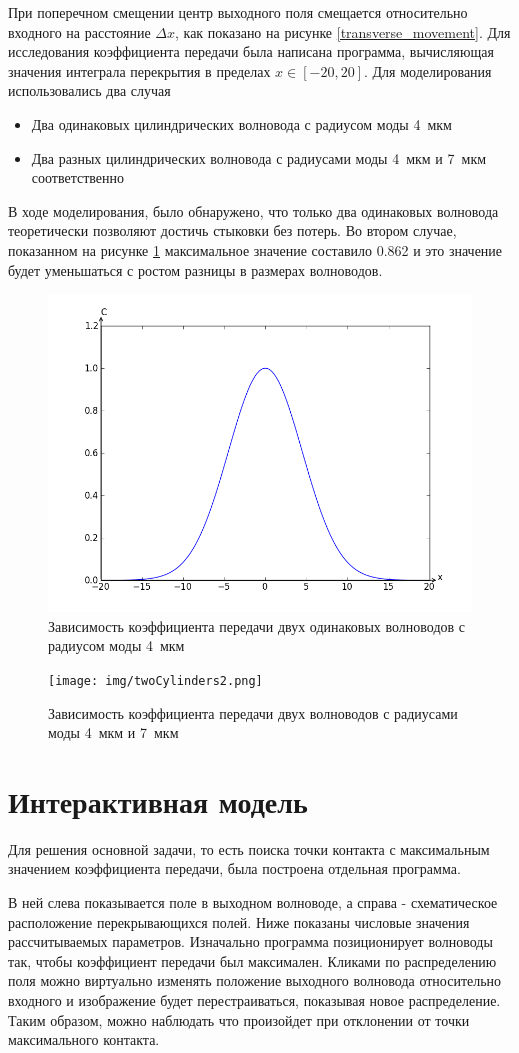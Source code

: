 При поперечном смещении центр выходного поля смещается относительно входного на расстояние $\Delta x$, как показано на рисунке \ref{transverse_movement}. Для исследования коэффициента передачи была написана программа, вычисляющая значения интеграла перекрытия в пределах $x \in [-20, 20]$.
Для моделирования использовались два случая
\begin{itemize}
	\item Два одинаковых цилиндрических волновода с радиусом моды 4~мкм
	\item Два разных цилиндрических волновода с радиусами моды 4~мкм и 7~мкм соответственно
\end{itemize}

В ходе моделирования, было обнаружено, что только два одинаковых волновода теоретически позволяют достичь стыковки без потерь. Во втором случае, показанном на рисунке \ref{twoCylinders2} максимальное значение составило 0.862 и это значение будет уменьшаться с ростом разницы в размерах волноводов.

\begin{figure}[h!]
		\includegraphics[width=0.5\linewidth]{img/twoCylinders.png}
		\caption{Зависимость коэффициента передачи двух одинаковых волноводов с радиусом моды 4~мкм}
\end{figure}
\begin{figure}[h!]
		\texttt{[image: img/twoCylinders2.png]}
		\caption{Зависимость коэффициента передачи двух волноводов с радиусами моды 4~мкм и 7~мкм}
		\label{twoCylinders2}
\end{figure}

\newpage
\section{Интерактивная модель}
Для решения основной задачи, то есть поиска точки контакта с максимальным значением коэффициента передачи, была построена отдельная программа.

В ней слева показывается поле в выходном волноводе, а справа - схематическое расположение перекрывающихся полей. Ниже показаны числовые значения рассчитываемых параметров. Изначально программа позиционирует волноводы так, чтобы коэффициент передачи был максимален. Кликами по распределению поля можно виртуально изменять положение выходного волновода относительно входного и изображение будет перестраиваться, показывая новое распределение. Таким образом, можно наблюдать что произойдет при отклонении от точки максимального контакта.

